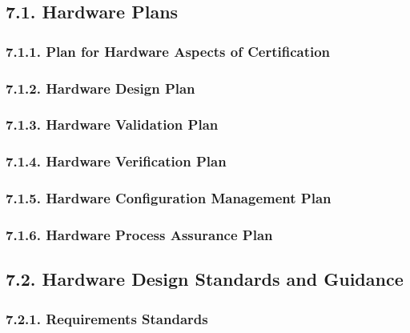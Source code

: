 \documentclass[]{article}
\begin{document}
\subsection{7.1. Hardware Plans}\label{hardware-plans}

\subsubsection{7.1.1. Plan for Hardware Aspects of
Certification}\label{plan-for-hardware-aspects-of-certification-1}

\subsubsection{7.1.2. Hardware Design
Plan}\label{hardware-design-plan-1}

\subsubsection{7.1.3. Hardware Validation
Plan}\label{hardware-validation-plan-1}

\subsubsection{7.1.4. Hardware Verification
Plan}\label{hardware-verification-plan-1}

\subsubsection{7.1.5. Hardware Configuration Management
Plan}\label{hardware-configuration-management-plan-1}

\subsubsection{7.1.6. Hardware Process Assurance
Plan}\label{hardware-process-assurance-plan-1}

\subsection{7.2. Hardware Design Standards and
Guidance}\label{hardware-design-standards-and-guidance}

\subsubsection{7.2.1. Requirements
Standards}\label{requirements-standards}
\end{document}
